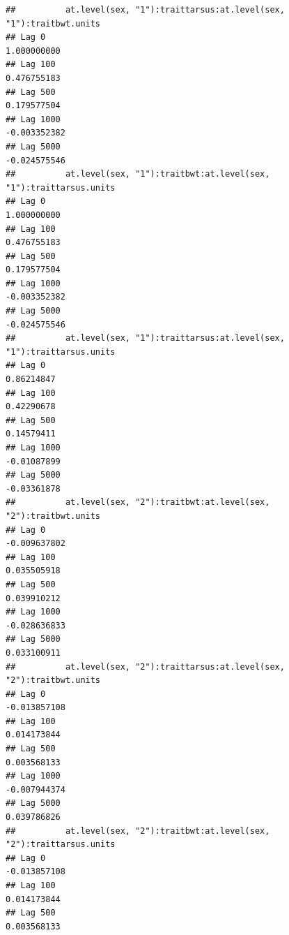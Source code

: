 \documentclass[
  12pt,
]{book}
\begin{document}
\begin{verbatim}
##          at.level(sex, "1"):traittarsus:at.level(sex, "1"):traitbwt.units
## Lag 0                                                         1.000000000
## Lag 100                                                       0.476755183
## Lag 500                                                       0.179577504
## Lag 1000                                                     -0.003352382
## Lag 5000                                                     -0.024575546
##          at.level(sex, "1"):traitbwt:at.level(sex, "1"):traittarsus.units
## Lag 0                                                         1.000000000
## Lag 100                                                       0.476755183
## Lag 500                                                       0.179577504
## Lag 1000                                                     -0.003352382
## Lag 5000                                                     -0.024575546
##          at.level(sex, "1"):traittarsus:at.level(sex, "1"):traittarsus.units
## Lag 0                                                             0.86214847
## Lag 100                                                           0.42290678
## Lag 500                                                           0.14579411
## Lag 1000                                                         -0.01087899
## Lag 5000                                                         -0.03361878
##          at.level(sex, "2"):traitbwt:at.level(sex, "2"):traitbwt.units
## Lag 0                                                     -0.009637802
## Lag 100                                                    0.035505918
## Lag 500                                                    0.039910212
## Lag 1000                                                  -0.028636833
## Lag 5000                                                   0.033100911
##          at.level(sex, "2"):traittarsus:at.level(sex, "2"):traitbwt.units
## Lag 0                                                        -0.013857108
## Lag 100                                                       0.014173844
## Lag 500                                                       0.003568133
## Lag 1000                                                     -0.007944374
## Lag 5000                                                      0.039786826
##          at.level(sex, "2"):traitbwt:at.level(sex, "2"):traittarsus.units
## Lag 0                                                        -0.013857108
## Lag 100                                                       0.014173844
## Lag 500                                                       0.003568133

\end{verbatim}
\end{document}
